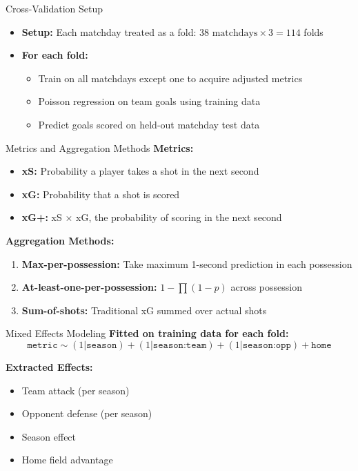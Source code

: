 \documentclass{beamer}
\begin{document}
\begin{frame}{Cross-Validation Setup}
\begin{itemize}
\item \textbf{Setup:} Each matchday treated as a fold: $38 \text{ matchdays} \times 3 = 114$ folds
\item \textbf{For each fold:}
  \begin{itemize}
  \item Train on all matchdays except one to acquire adjusted metrics
  \item Poisson regression on team goals using training data
  \item Predict goals scored on held-out matchday test data
  \end{itemize}
\end{itemize}
\end{frame}

\begin{frame}{Metrics and Aggregation Methods}
\textbf{Metrics:}
\begin{itemize}
\item \textbf{xS:} Probability a player takes a shot in the next second
\item \textbf{xG:} Probability that a shot is scored
\item \textbf{xG+:} xS $\times$ xG, the probability of scoring in the next second
\end{itemize}

\textbf{Aggregation Methods:}
\begin{enumerate}
\item \textbf{Max-per-possession:} Take maximum 1-second prediction in each possession
\item \textbf{At-least-one-per-possession:} $1 - \prod (1 - p)$ across possession
\item \textbf{Sum-of-shots:} Traditional xG summed over actual shots
\end{enumerate}
\end{frame}

\begin{frame}{Mixed Effects Modeling}
\textbf{Fitted on training data for each fold:}
$$\texttt{metric} \sim (1|\texttt{season}) + (1|\texttt{season:team}) + (1|\texttt{season:opp}) + \texttt{home}$$

\textbf{Extracted Effects:}
\begin{itemize}
\item Team attack (per season)
\item Opponent defense (per season)
\item Season effect
\item Home field advantage
\end{itemize}
\end{frame}
\end{document}
